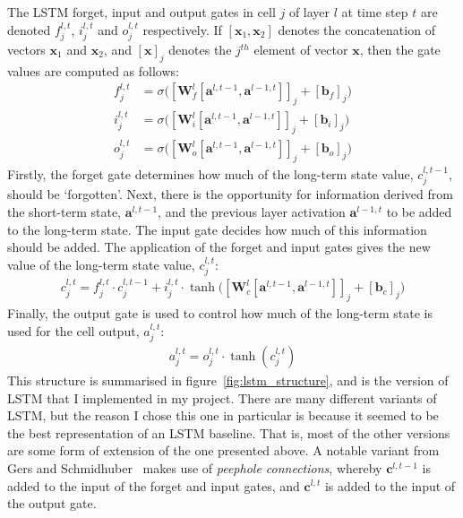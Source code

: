\documentclass[a4paper, 12pt]{report}
\newcommand{\tit}[1]{\textit{#1}}
\begin{document}
The LSTM forget, input and output gates in cell $j$ of layer $l$ at time step $t$ are denoted $f_j^{l, t}$, $i_j^{l, t}$ and $o_j^{l, t}$ respectively. If $[\mathbf{x}_1, \mathbf{x}_2]$ denotes the concatenation of vectors $\mathbf{x}_1$ and $\mathbf{x}_2$, and $[\mathbf{x}]_j$ denotes the $j^{th}$ element of vector $\mathbf{x}$, then the gate values are computed as follows:
\begin{align}
	f_j^{l, t} &= \sigma \big( [\mathbf{W}_f^l [\mathbf{a}^{l, t - 1}, \mathbf{a}^{l - 1, t}]]_j + [\mathbf{b}_f]_j \big) \\
	i_j^{l, t} &= \sigma \big( [\mathbf{W}_i^l [\mathbf{a}^{l, t - 1}, \mathbf{a}^{l - 1, t}]]_j + [\mathbf{b}_i]_j \big) \\
	o_j^{l, t} &= \sigma \big( [\mathbf{W}_o^l [\mathbf{a}^{l, t - 1}, \mathbf{a}^{l - 1, t}]]_j + [\mathbf{b}_o]_j \big)
\end{align}
Firstly, the forget gate determines how much of the long-term state value, $c_j^{l, t - 1}$, should be `forgotten'. Next, there is the opportunity for information derived from the short-term state, $\mathbf{a}^{l, t - 1}$, and the previous layer activation $\mathbf{a}^{l - 1, t}$ to be added to the long-term state. The input gate decides how much of this information should be added. The application of the forget and input gates gives the new value of the long-term state value, $c_j^{l, t}$:
\begin{gather}
	c_j^{l, t} = f_j^{l, t} \cdot c_j^{l, t - 1} + i_j^{l, t} \cdot \tanh \big( [\mathbf{W}_c^l [\mathbf{a}^{l, t - 1}, \mathbf{a}^{l - 1, t}]]_j + [\mathbf{b}_c]_j \big)
\end{gather}
Finally, the output gate is used to control how much of the long-term state is used for the cell output, $a_j^{l, t}$:
\begin{gather}
	a_j^{l, t} = o_j^{l, t} \cdot \tanh (c_j^{l, t})
\end{gather}
This structure is summarised in figure~\ref{fig:lstm_structure}, and is the version of LSTM that I implemented in my project. There are many different variants of LSTM, but the reason I chose this one in particular is because it seemed to be the best representation of an LSTM baseline. That is, most of the other versions are some form of extension of the one presented above. A notable variant from Gers and Schmidhuber~\cite{peephole:gers2000} makes use of \tit{peephole connections}, whereby $\mathbf{c}^{l, t - 1}$ is added to the input of the forget and input gates, and $\mathbf{c}^{l, t}$ is added to the input of the output gate.
\end{document}
